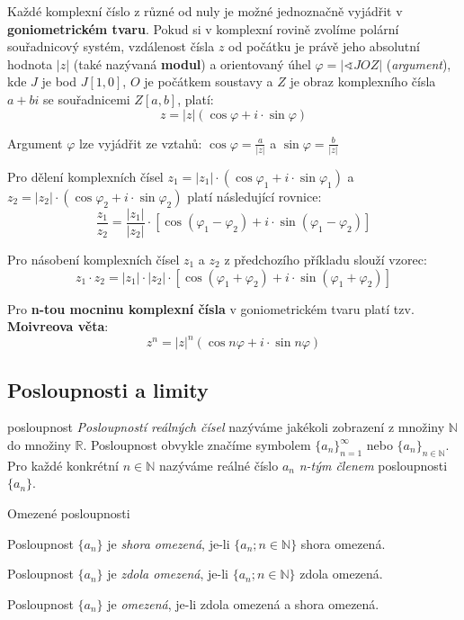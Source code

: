Každé komplexní číslo z různé od nuly je možné jednoznačně vyjádřit v \textbf{goniometrickém tvaru}. Pokud si v komplexní rovině zvolíme polární souřadnicový systém, vzdálenost čísla $z$ od počátku je právě jeho absolutní hodnota $|z|$ (také nazývaná \textbf{modul}) a orientovaný úhel $\varphi = |\sphericalangle JOZ|$ (\emph{argument}), kde $J$ je bod $J[1,0]$, $O$ je počátkem soustavy a $Z$ je obraz komplexního čísla $a + bi$ se souřadnicemi $Z[a,b]$, platí:
$$z = |z| (\cos \varphi + i\cdot \sin \varphi)$$

Argument $\varphi$ lze vyjádřit ze vztahů: $\cos \varphi = \frac{a}{|z|}$ a $\sin \varphi = \frac{b}{|z|}$

Pro dělení komplexních čísel $z_1 = |z_1|\cdot (\cos\varphi_1 + i\cdot \sin
\varphi_1)$ a $z_2 = |z_2|\cdot (\cos \varphi_2 + i\cdot \sin \varphi_2)$ platí následující rovnice:
$$\frac{z_1}{z_2} = \frac{|z_1|}{|z_2|}\cdot \left[ \cos(\varphi_1 - \varphi_2) + i\cdot \sin(\varphi_1 - \varphi_2) \right]$$

Pro násobení komplexních čísel $z_1$ a $z_2$ z předchozího příkladu slouží vzorec:
$$z_1 \cdot  z_2 = |z_1|\cdot |z_2|\cdot \left[ \cos(\varphi_1 + \varphi_2) + i\cdot \sin(\varphi_1 + \varphi_2) \right]$$

Pro \textbf{n-tou mocninu komplexní čísla} v goniometrickém tvaru platí tzv. \textbf{Moivreova věta}:
$$z^n = |z|^n (\cos n \varphi + i\cdot \sin n \varphi)$$

\subsection{Posloupnosti a limity}
\begin{definiceN}{posloupnost}
\emph{Posloupností reálných čísel} nazýváme jakékoli zobrazení z množiny $\mathbb{N}$ do množiny $\mathbb{R}$. Posloupnost obvykle značíme symbolem $\{a_n\}^{\infty}_{n=1}$ nebo $\{a_n\}_{n \in \mathbb{N}}$. Pro každé konkrétní $n \in \mathbb{N}$ nazýváme reálné číslo $a_n$ \emph{n-tým členem} posloupnosti $\{a_n\}$.
\end{definiceN}

\begin{definiceN}{Omezené posloupnosti}
\begin{penumerate}
	\item Posloupnost $\{a_n\}$ je \emph{shora omezená}, je-li $\{a_n; n \in \mathbb{N}\}$ shora omezená.
	\item Posloupnost $\{a_n\}$ je \emph{zdola omezená}, je-li $\{a_n; n \in \mathbb{N}\}$ zdola omezená.
	\item Posloupnost $\{a_n\}$ je \emph{omezená}, je-li zdola omezená a shora omezená.
\end{penumerate}
\end{definiceN}

